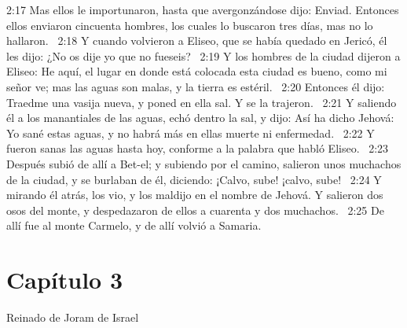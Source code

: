 2:17 Mas ellos le importunaron, hasta que avergonzándose dijo: Enviad. Entonces ellos enviaron cincuenta hombres, los cuales lo buscaron tres días, mas no lo hallaron.  
2:18 Y cuando volvieron a Eliseo, que se había quedado en Jericó, él les dijo: ¿No os dije yo que no fueseis?  
2:19 Y los hombres de la ciudad dijeron a Eliseo: He aquí, el lugar en donde está colocada esta ciudad es bueno, como mi señor ve; mas las aguas son malas, y la tierra es estéril.  
2:20 Entonces él dijo: Traedme una vasija nueva, y poned en ella sal. Y se la trajeron.  
2:21 Y saliendo él a los manantiales de las aguas, echó dentro la sal, y dijo: Así ha dicho Jehová: Yo sané estas aguas, y no habrá más en ellas muerte ni enfermedad.  
2:22 Y fueron sanas las aguas hasta hoy, conforme a la palabra que habló Eliseo.  
2:23 Después subió de allí a Bet-el; y subiendo por el camino, salieron unos muchachos de la ciudad, y se burlaban de él, diciendo: ¡Calvo, sube! ¡calvo, sube!  
2:24 Y mirando él atrás, los vio, y los maldijo en el nombre de Jehová. Y salieron dos osos del monte, y despedazaron de ellos a cuarenta y dos muchachos.  
2:25 De allí fue al monte Carmelo, y de allí volvió a Samaria.  
\section*{Capítulo 3}
Reinado de Joram de Israel  

